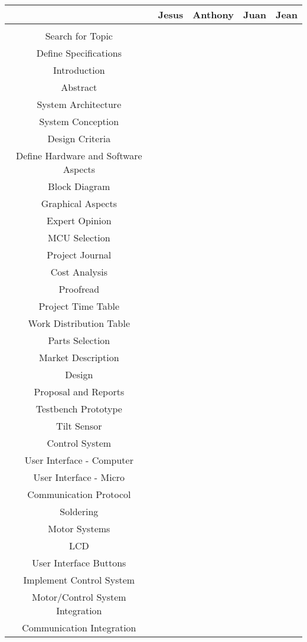 \documentclass[11pt]{article}
\newcommand{\xmark}{\ding{55}}%
\begin{document}
\begin{tabular}{|c|c|c|c|c|}
\hline
 & Jesus & Anthony & Juan & Jean \\
\hline
& & & & \\
Search for Topic &	\xmark &\xmark &\xmark &\xmark \\
Define Specifications &	\xmark &\xmark &\xmark &\xmark \\
Introduction & & & &\xmark  \\
Abstract & & & &\xmark \\
System Architecture	& & &\xmark & \\	
System Conception& &\xmark & & \\		
Design Criteria	& &\xmark & & \\		
Define Hardware and Software Aspects&\xmark & \xmark& \xmark&\xmark \\
Block Diagram& &\xmark & & \\
Graphical Aspects& & \xmark&\xmark & \\
Expert Opinion& &\xmark & &\xmark \\
MCU Selection& \xmark&\xmark & \xmark&\xmark \\
Project Journal	& & & &\xmark \\
Cost Analysis&\xmark & \xmark & \xmark & \xmark \\
Proofread& & & &\xmark \\
Project Time Table&\xmark & & & \xmark\\
Work Distribution Table&\xmark & & &\xmark \\
Parts Selection&\xmark &\xmark & \xmark& \xmark\\
Market Description&\xmark & & & \\	
Design	& \xmark& \xmark&\xmark &\xmark \\
Proposal and Reports&\xmark & \xmark &\xmark &\xmark \\
Testbench Prototype& & &\xmark &\xmark \\
Tilt Sensor	&\xmark &\xmark & & \\	
Control System & & & &\xmark \\
User Interface - Computer&\xmark &\xmark & & \\		
User Interface - Micro& & &\xmark &\xmark \\
Communication Protocol&\xmark & & &\xmark \\
Soldering& & &\xmark &\xmark \\
Motor Systems& & &\xmark &\xmark \\
LCD	& &\xmark &\xmark & \\
User Interface Buttons&\xmark & & &\xmark \\
Implement Control System& & & &\xmark \\
Motor/Control System Integration& &\xmark & &\xmark \\
Communication Integration&\xmark & &\xmark & \\	

\hline
\end{tabular}
\end{document}
